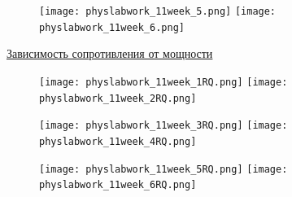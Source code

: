 \documentclass[a4paper,12pt]{article} %
\begin{document}
\begin{figure}[h!]
\begin{floatrow}
         {\texttt{[image: physlabwork\_11week\_5.png]}}
         {\texttt{[image: physlabwork\_11week\_6.png]}}         
\end{floatrow}
\end{figure}
\restoregeometry


\hypertarget{p6}{\hyperlink{p4}{Зависимость сопротивления от мощности}} 

\begin{figure}[h!]
\begin{floatrow}
         {\texttt{[image: physlabwork\_11week\_1RQ.png]}}
         {\texttt{[image: physlabwork\_11week\_2RQ.png]}}         
\end{floatrow}
\end{figure}

\begin{figure}[h!]
\begin{floatrow}
         {\texttt{[image: physlabwork\_11week\_3RQ.png]}}
         {\texttt{[image: physlabwork\_11week\_4RQ.png]}}         
\end{floatrow}
\end{figure}

\begin{figure}[h!]
\begin{floatrow}
         {\texttt{[image: physlabwork\_11week\_5RQ.png]}}
         {\texttt{[image: physlabwork\_11week\_6RQ.png]}}         
\end{floatrow}
\end{figure}
\restoregeometry

\end{document}
